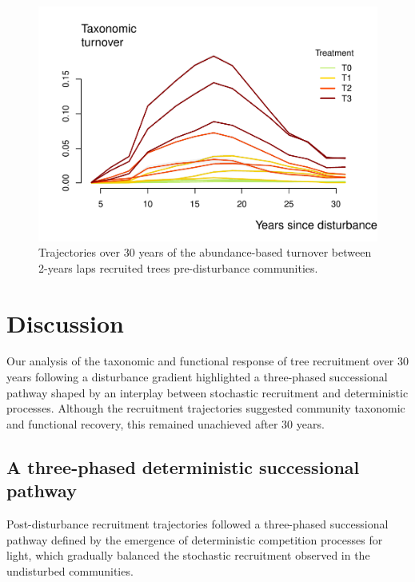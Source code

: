 \documentclass[fleqn,10pt]{ArtEcoFoG} %
\begin{document}
\begin{figure}

{\centering \includegraphics[width=1\linewidth]{RecruitmentTrajectories_files/figure-latex/Turnover-1} 

}

\caption{Trajectories over 30 years of the abundance-based turnover between 2-years laps recruited trees pre-disturbance communities.}\label{fig:Turnover}
\end{figure}

\section{Discussion}\label{discussion}

Our analysis of the taxonomic and functional response of tree
recruitment over 30 years following a disturbance gradient highlighted a
three-phased successional pathway shaped by an interplay between
stochastic recruitment and deterministic processes. Although the
recruitment trajectories suggested community taxonomic and functional
recovery, this remained unachieved after 30 years.

\subsection{A three-phased deterministic successional
pathway}\label{a-three-phased-deterministic-successional-pathway}

Post-disturbance recruitment trajectories followed a three-phased
successional pathway defined by the emergence of deterministic
competition processes for light, which gradually balanced the stochastic
recruitment observed in the undisturbed communities.
\end{document}
